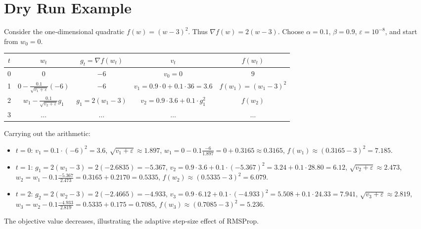 \documentclass{article}
\begin{document}
\section*{Dry Run Example}
Consider the one‑dimensional quadratic $f(w)=(w-3)^2$.  
Thus $\nabla f(w)=2(w-3)$.  Choose $\alpha=0.1$, $\beta=0.9$, $\varepsilon=10^{-8}$,
and start from $w_0=0$.

\begin{center}
\begin{tabular}{c|c|c|c|c}
$t$ & $w_t$ & $g_t= \nabla f(w_t)$ & $v_t$ & $f(w_t)$\\ \hline
0 & $0$ & $-6$ & $v_0=0$ & $9$\\
1 & $0- \frac{0.1}{\sqrt{v_1+\varepsilon}}(-6)$ & $-6$ & $v_1=0.9\cdot0+0.1\cdot36=3.6$ & $f(w_1)= (w_1-3)^2$\\
2 & $w_1- \frac{0.1}{\sqrt{v_2+\varepsilon}}g_1$ & $g_1=2(w_1-3)$ & $v_2=0.9\cdot3.6+0.1\cdot g_1^2$ & $f(w_2)$\\
3 & $\dots$ & $\dots$ & $\dots$ & $\dots$
\end{tabular}
\end{center}
Carrying out the arithmetic:

\begin{itemize}[noitemsep,topsep=0pt]
\item $t=0$: $v_1=0.1\cdot (-6)^2 = 3.6$, $\sqrt{v_1+\varepsilon}\approx1.897$,  
      $w_1 = 0 - 0.1\frac{-6}{1.897}=0+0.3165\approx0.3165$,
      $f(w_1) \approx (0.3165-3)^2 = 7.185$.

\item $t=1$: $g_1 = 2(w_1-3)=2(-2.6835)=-5.367$,  
      $v_2 = 0.9\cdot3.6 + 0.1\cdot (-5.367)^2 = 3.24 + 0.1\cdot28.80 = 6.12$,  
      $\sqrt{v_2+\varepsilon}\approx2.473$,  
      $w_2 = w_1 - 0.1\frac{-5.367}{2.473}=0.3165+0.2170=0.5335$,  
      $f(w_2)\approx (0.5335-3)^2 = 6.079$.

\item $t=2$: $g_2 = 2(w_2-3)=2(-2.4665)=-4.933$,  
      $v_3 = 0.9\cdot6.12 + 0.1\cdot(-4.933)^2 = 5.508 + 0.1\cdot24.33 = 7.941$,  
      $\sqrt{v_3+\varepsilon}\approx2.819$,  
      $w_3 = w_2 - 0.1\frac{-4.933}{2.819}=0.5335+0.175=0.7085$,  
      $f(w_3)\approx (0.7085-3)^2 = 5.236$.
\end{itemize}
The objective value decreases, illustrating the adaptive step‑size effect of RMSProp.

\newpage
\end{document}
